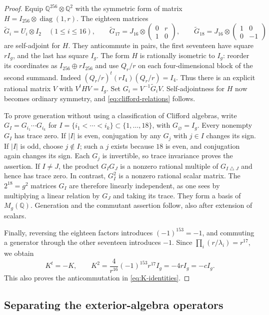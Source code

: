 \documentclass[11pt]{article}
\numberwithin{equation}{section}
\theoremstyle{definition}
\theoremstyle{remark}
\newcommand{\Q}{\mathbb Q}
\begin{document}
\begin{proof}
Equip $\Q^{256}\otimes\Q^2$ with the symmetric form of matrix
$H=I_{256}\otimes\operatorname{diag}(1,r)$.  The eighteen matrices
\[
 \widetilde G_i=U_i\otimes I_2\quad(1\le i\le16),\qquad
 \widetilde G_{17}=J_{16}\otimes
     \begin{pmatrix}0&r\\1&0\end{pmatrix},\qquad
 \widetilde G_{18}=J_{16}\otimes
     \begin{pmatrix}1&0\\0&-1\end{pmatrix}
\]
are self-adjoint for $H$.  They anticommute in pairs, the first seventeen
have square $rI_g$, and the last has square $I_g$.
The form $H$ is rationally isometric to $I_g$: reorder its coordinates
as $I_{256}\oplus rI_{256}$ and use $Q_r/r$ on each four-dimensional
block of the second summand.  Indeed
$(Q_r/r)^t(rI_4)(Q_r/r)=I_4$.
Thus there is an explicit rational matrix $V$ with $V^tHV=I_g$.
Set $G_i=V^{-1}\widetilde G_iV$.  Self-adjointness for $H$ now becomes
ordinary symmetry, and \eqref{eq:clifford-relations} follows.

To prove generation without using a classification of Clifford algebras,
write $G_I=G_{i_1}\cdots G_{i_k}$ for
$I=\{i_1<\cdots<i_k\}\subset\{1,\ldots,18\}$, with $G_\varnothing=I_g$.
Every nonempty $G_I$ has trace zero.  If $|I|$ is even, conjugation by
any $G_j$ with $j\in I$ changes its sign.  If $|I|$ is odd, choose
$j\notin I$; such a $j$ exists because $18$ is even, and conjugation
again changes its sign.  Each $G_j$ is invertible, so trace invariance
proves the assertion.  If $I\ne J$, the product $G_IG_J$ is a nonzero
rational multiple of $G_{I\mathbin{\triangle}J}$ and hence has trace
zero.  In contrast, $G_I^2$ is a nonzero rational scalar matrix.
The $2^{18}=g^2$ matrices $G_I$ are therefore linearly independent,
as one sees by multiplying a linear relation by $G_J$ and taking its
trace.  They form a basis of $M_g(\Q)$.  Generation and the commutant
assertion follow, also after extension of scalars.

Finally, reversing the eighteen factors introduces
$(-1)^{153}=-1$, and commuting a generator through the other seventeen
introduces $-1$.  Since
$\prod_i(r/\lambda_i)=r^{17}$, we obtain
\[
 K^t=-K,\qquad
 K^2=\frac4{r^{16}}(-1)^{153}r^{17}I_g=-4rI_g=-cI_g.
\]
This also proves the anticommutation in \eqref{eq:K-identities}.
\end{proof}

\subsection{Separating the exterior-algebra operators}
\end{document}
